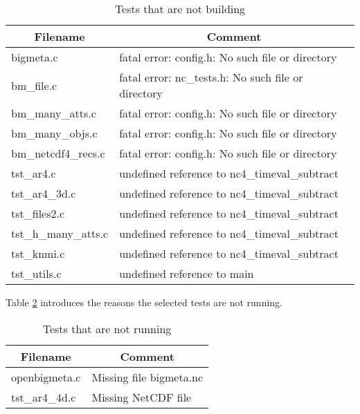 \begin{table}[H]
\centering
\begin{tabular}{|l|m{8cm}|}
\hline
\multicolumn{1}{|c|}{\parbox{4cm}{\centering Filename}}  & \multicolumn{1}{c|}{Comment}                       \\ \hline \hline
bigmeta.c                   & fatal error: config.h: No such file or directory    \\ \hline
bm\_file.c                  & fatal error: nc\_tests.h: No such file or directory \\ \hline
bm\_many\_atts.c            & fatal error: config.h: No such file or directory    \\ \hline
bm\_many\_objs.c            & fatal error: config.h: No such file or directory    \\ \hline
bm\_netcdf4\_recs.c         & fatal error: config.h: No such file or directory    \\ \hline
tst\_ar4.c                  & undefined reference to nc4\_timeval\_subtract       \\ \hline
tst\_ar4\_3d.c              & undefined reference to nc4\_timeval\_subtract       \\ \hline
tst\_files2.c               & undefined reference to nc4\_timeval\_subtract       \\ \hline
tst\_h\_many\_atts.c        & undefined reference to nc4\_timeval\_subtract       \\ \hline
tst\_knmi.c                 & undefined reference to nc4\_timeval\_subtract       \\ \hline
tst\_utils.c                & undefined reference to main \\ \hline
\hline
\end{tabular}
\caption{\label{test_b}Tests that are not building}
\end{table}

Table \ref{test_r} introduces the reasons the selected tests are not running.

\begin{table}[H]
\centering
\begin{tabular}{|l|m{8cm}|}
\hline
\multicolumn{1}{|c|}{\parbox{4cm}{\centering Filename}}  & \multicolumn{1}{c|}{Comment} \\ \hline \hline

openbigmeta.c               & Missing file bigmeta.nc       \\ \hline
tst\_ar4\_4d.c              & Missing NetCDF file           \\ \hline
\hline
\end{tabular}
\caption{\label{test_r}Tests that are not running}
\end{table}
